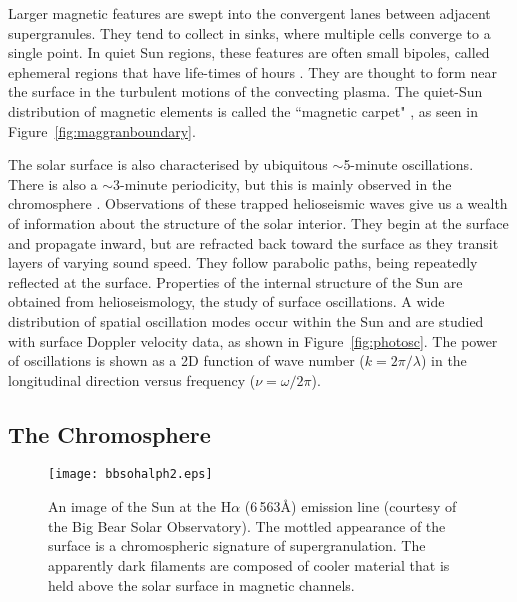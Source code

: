 Larger magnetic features are swept into the convergent lanes between adjacent supergranules. They tend to collect in sinks, where multiple cells converge to a single point. In quiet Sun regions, these features are often small bipoles, called ephemeral regions that have life-times of hours \citep{Hagenaar:2001}. They are thought to form near the surface in the turbulent motions of the convecting plasma. The quiet-Sun distribution of magnetic elements is called the ``magnetic carpet" \citep{Schrijver:1997b}, as seen in Figure~\ref{fig:maggranboundary}.

The solar surface is also characterised by ubiquitous $\sim$5-minute oscillations. %
There is also a $\sim$3-minute periodicity, but this is mainly observed in the chromosphere \citep{Solanki:2003}. 
Observations of these trapped helioseismic waves give us a wealth of information about the structure of the solar interior. They begin at the surface and  propagate inward, but are refracted  back toward the surface as they transit layers of varying sound speed. They follow parabolic paths, being repeatedly reflected at the surface. Properties of the internal structure of the Sun are obtained from helioseismology, the study of surface oscillations. A wide distribution of spatial oscillation modes occur within the Sun and are studied with surface  Doppler velocity data, as shown in Figure~\ref{fig:photosc}. The power of oscillations is shown as a 2D function of wave number ($k = 2\pi/\lambda$) in the longitudinal direction versus frequency ($\nu = \omega/2\pi$).


\subsection{The Chromosphere}\label{sect:chroma}

\begin{figure}[!t]
\centerline{\texttt{[image: bbsohalph2.eps]}}
\caption[An image of the Sun at the H$\alpha$ absorption line.]{An image of the Sun at the H$\alpha$ (6\,563\AA) emission line (courtesy of the Big Bear Solar Observatory). The mottled appearance of the surface is a chromospheric signature of supergranulation. The apparently dark filaments are composed of cooler material that is held above the solar surface in magnetic channels.}
\label{fig:chromfd}
\end{figure}

